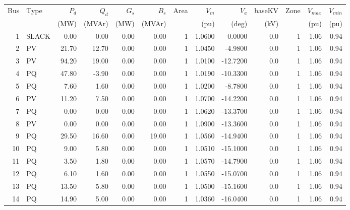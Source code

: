 \begin{tabular}{r l r r r r r r r r r r r}\toprule
Bus & Type & {$P_d$} & {$Q_d$} & {$G_s$} & {$B_s$} & Area & {$V_m$} & {$V_a$} & {baseKV} & Zone & {$V_{max}$} & {$V_{min}$} \\ 
{} & {} & {(MW)} & {(MVAr)} & {(MW)} & {(MVAr)} & {} & {(pu)} & {(deg)} & {(kV)} & {} & {(pu)} & {(pu)} \\ \midrule
1 & SLACK & 0.00 & 0.00 & 0.00 & 0.00 & 1 & 1.0600 & 0.0000 & 0.0 & 1 & 1.06 & 0.94 \\ 
2 & PV & 21.70 & 12.70 & 0.00 & 0.00 & 1 & 1.0450 & -4.9800 & 0.0 & 1 & 1.06 & 0.94 \\ 
3 & PV & 94.20 & 19.00 & 0.00 & 0.00 & 1 & 1.0100 & -12.7200 & 0.0 & 1 & 1.06 & 0.94 \\ 
4 & PQ & 47.80 & -3.90 & 0.00 & 0.00 & 1 & 1.0190 & -10.3300 & 0.0 & 1 & 1.06 & 0.94 \\ 
5 & PQ & 7.60 & 1.60 & 0.00 & 0.00 & 1 & 1.0200 & -8.7800 & 0.0 & 1 & 1.06 & 0.94 \\ 
6 & PV & 11.20 & 7.50 & 0.00 & 0.00 & 1 & 1.0700 & -14.2200 & 0.0 & 1 & 1.06 & 0.94 \\ 
7 & PQ & 0.00 & 0.00 & 0.00 & 0.00 & 1 & 1.0620 & -13.3700 & 0.0 & 1 & 1.06 & 0.94 \\ 
8 & PV & 0.00 & 0.00 & 0.00 & 0.00 & 1 & 1.0900 & -13.3600 & 0.0 & 1 & 1.06 & 0.94 \\ 
9 & PQ & 29.50 & 16.60 & 0.00 & 19.00 & 1 & 1.0560 & -14.9400 & 0.0 & 1 & 1.06 & 0.94 \\ 
10 & PQ & 9.00 & 5.80 & 0.00 & 0.00 & 1 & 1.0510 & -15.1000 & 0.0 & 1 & 1.06 & 0.94 \\ 
11 & PQ & 3.50 & 1.80 & 0.00 & 0.00 & 1 & 1.0570 & -14.7900 & 0.0 & 1 & 1.06 & 0.94 \\ 
12 & PQ & 6.10 & 1.60 & 0.00 & 0.00 & 1 & 1.0550 & -15.0700 & 0.0 & 1 & 1.06 & 0.94 \\ 
13 & PQ & 13.50 & 5.80 & 0.00 & 0.00 & 1 & 1.0500 & -15.1600 & 0.0 & 1 & 1.06 & 0.94 \\ 
14 & PQ & 14.90 & 5.00 & 0.00 & 0.00 & 1 & 1.0360 & -16.0400 & 0.0 & 1 & 1.06 & 0.94 \\ 
\bottomrule\end{tabular}
